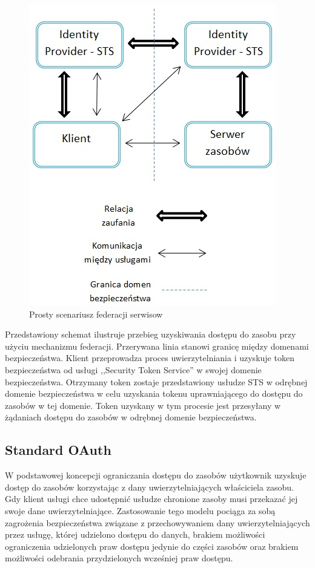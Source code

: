 		\begin{figure}[h]
			\centering
				\includegraphics{img/ws-federation.jpg}
			\caption{Prosty scenariusz federacji serwisow}
			\label{Prosty scenariusz federacji serwisow}
		\end{figure}

		Przedstawiony schemat ilustruje przebieg uzyskiwania dostępu do zasobu przy użyciu mechanizmu federacji. Przerywana linia stanowi granicę między domenami bezpieczeństwa. Klient przeprowadza proces uwierzytelniania  i uzyskuje token bezpieczeństwa od usługi ,,Security Token Service'' w swojej domenie bezpieczeństwa. Otrzymany token zostaje przedstawiony usłudze STS w odrębnej domenie bezpieczeństwa w celu uzyskania tokenu uprawniającego do dostępu do zasobów w tej domenie. Token uzyskany w tym procesie jest przesyłany w żądaniach dostępu do zasobów w odrębnej domenie bezpieczeństwa. 

	\subsection{Standard OAuth}

		W podstawowej koncepcji ograniczania dostępu do zasobów użytkownik uzyskuje dostęp do zasobów korzystając z dany uwierzytelniających właściciela zasobu. Gdy klient usługi chce udostępnić usłudze chronione zasoby musi przekazać jej swoje dane uwierzytelniające.  Zastosowanie tego modelu pociąga za sobą zagrożenia bezpieczeństwa związane z przechowywaniem dany uwierzytelniających przez usługę, której udzielono dostępu do danych, brakiem możliwości ograniczenia udzielonych praw dostępu jedynie do części zasobów oraz brakiem możliwości odebrania przydzielonych wcześniej praw dostępu.

